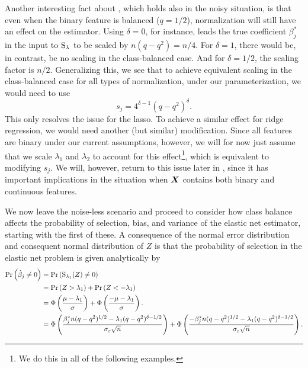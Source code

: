 Another interesting fact about , which holds also in the noisy situation, is that even when the binary feature is balanced (\(q = 1/2\)), normalization will still have an effect on the estimator.
Using \(\delta = 0\), for instance, leads the true coefficient \(\beta_j^*\) in the input to \(\operatorname{S}_\lambda\) to be scaled by \(n (q - q^2) = n/4\). For \(\delta = 1\), there would be, in contrast, be no scaling in the class-balanced case. And for \(\delta = 1/2\), the scaling factor is \(n/2\). Generalizing this, we see that to achieve equivalent scaling in the class-balanced case for all types of normalization, under our parameterization, we would need to use
\[
  s_j = 4^{\delta - 1} (q - q^2)^\delta.
\]
This only resolves the issue for the lasso.
To achieve a similar effect for ridge regression, we would need another (but similar) modification.
Since all features are binary under our current assumptions, however, we will for now just assume that we scale \(\lambda_1\) and \(\lambda_2\) to account for this effect\footnote{We do this in all of the following examples.}, which is equivalent to modifying \(s_j\). We will, however, return to this issue later in , since it has important implications in the situation when \(\boldsymbol{X}\) contains both binary and continuous features.


We now leave the noise-less scenario and proceed to consider how class balance affects the probability of selection, bias, and variance of the elastic net estimator, starting with the first of these. A consequence of the normal error distribution and consequent normal distribution of \(Z\) is that the probability of selection in the elastic net problem is given analytically by
\begin{align*}
  \Pr\left(\hat{\beta}_j \neq 0\right) & = \Pr\left(\operatorname{S}_{\lambda_1}(Z) \neq 0\right)                                                                                                                                                                                                               \\
                                       & = \Pr\left(Z > \lambda_1\right) + \Pr\left(Z < -\lambda_1\right)                                                                                                                                                                                          \\
                                       & = \operatorname{\Phi}\left(\frac{\mu - \lambda_1}{\sigma}\right) + \operatorname{\Phi}\left(\frac{- \mu -\lambda_1}{\sigma}\right).                                                                                                                                                     \\
                                       & = \operatorname{\Phi} \left( \frac{\beta_j^*n (q-q^2)^{1/2} - \lambda_1(q-q^2)^{\delta - 1/2}}{\sigma_\varepsilon \sqrt{n}}\right)                 + \operatorname{\Phi} \left( \frac{-\beta_j^*n (q-q^2)^{1/2} - \lambda_1(q-q^2)^{\delta - 1/2}}{\sigma_\varepsilon \sqrt{n}}\right).
\end{align*}

